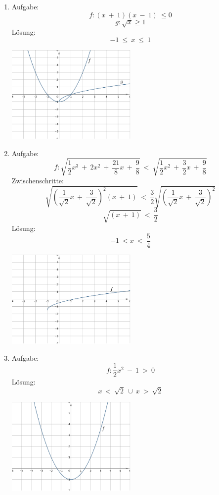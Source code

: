 \begin{enumerate}
	\item Aufgabe:
					\[f : (x \ + \ 1)(x \ - \ 1) \ \leq 0\]
					\[g : \sqrt x \geq 1 \]
				L\"osung:
					\[-1 \ \leq \ x \ \leq \ 1\]
					\begin{center}
						\includegraphics[width=0.5\textwidth]{img/Aufgaben/Analytisch/A1.PNG}
					\end{center}
	\item Aufgabe:
					\[f : \sqrt{\frac 1 2 x^3 \ + \ 2x^2 \ + \ \frac {21} 8 x \ + \ \frac 9 8} \ < \ \sqrt{\frac 1 2 x^2 \ + \ \frac 3 2 x \ + \ \frac 9 8 } \]
				Zwischenschritte: 
	  			\[ \sqrt{ (\frac 1 {\sqrt 2} x \ + \ \frac 3 {\sqrt 2})^2 ( x \ + \ 1)} \ < \ \frac 3 2 \sqrt{(\frac 1	{\sqrt 2} x \ + \ \frac 3 {\sqrt 2})^2}\]
	  			\[\sqrt {(x \ + \ 1)} \ < \ \frac 3 2\]
	  		L\"osung:
	  			\[-1 \ < x \ < \ \frac 5 4\]
	  			\begin{center}
						\includegraphics[width=0.5\textwidth]{img/Aufgaben/Analytisch/A2.PNG}
					\end{center}
	\item Aufgabe:
					\[f : \frac 1 2 x^2 \ - \ 1 \ > \ 0\]
				L\"osung:
					\[x \ < \ \sqrt 2 \ \cup \ x \ > \ \sqrt 2\]
					\begin{center}
						\includegraphics[width=0.5\textwidth]{img/Aufgaben/Analytisch/A3.PNG}

\end{center}
\end{enumerate}
